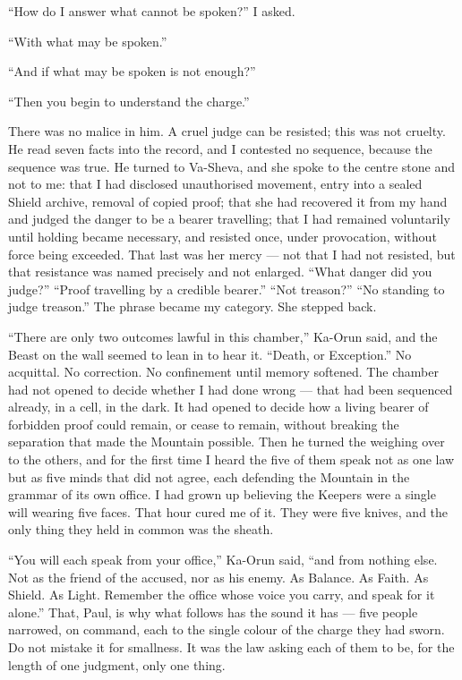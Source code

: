 ``How do I answer what cannot be spoken?'' I asked.\par
 
``With what may be spoken.''\par
 
``And if what may be spoken is not enough?''\par
 
``Then you begin to understand the charge.''\par
 
There was no malice in him. A cruel judge can be resisted; this was not cruelty. He read seven facts into the record, and I contested no sequence, because the sequence was true. He turned to Va-Sheva, and she spoke to the centre stone and not to me: that I had disclosed unauthorised movement, entry into a sealed Shield archive, removal of copied proof; that she had recovered it from my hand and judged the danger to be a bearer travelling; that I had remained voluntarily until holding became necessary, and resisted once, under provocation, without force being exceeded. That last was her mercy — not that I had not resisted, but that resistance was named precisely and not enlarged. ``What danger did you judge?'' ``Proof travelling by a credible bearer.'' ``Not treason?'' ``No standing to judge treason.'' The phrase became my category. She stepped back.\par
 
``There are only two outcomes lawful in this chamber,'' Ka-Orun said, and the Beast on the wall seemed to lean in to hear it. ``Death, or Exception.'' No acquittal. No correction. No confinement until memory softened. The chamber had not opened to decide whether I had done wrong — that had been sequenced already, in a cell, in the dark. It had opened to decide how a living bearer of forbidden proof could remain, or cease to remain, without breaking the separation that made the Mountain possible. Then he turned the weighing over to the others, and for the first time I heard the five of them speak not as one law but as five minds that did not agree, each defending the Mountain in the grammar of its own office. I had grown up believing the Keepers were a single will wearing five faces. That hour cured me of it. They were five knives, and the only thing they held in common was the sheath.\par
 
``You will each speak from your office,'' Ka-Orun said, ``and from nothing else. Not as the friend of the accused, nor as his enemy. As Balance. As Faith. As Shield. As Light. Remember the office whose voice you carry, and speak for it alone.'' That, Paul, is why what follows has the sound it has — five people narrowed, on command, each to the single colour of the charge they had sworn. Do not mistake it for smallness. It was the law asking each of them to be, for the length of one judgment, only one thing.\par

